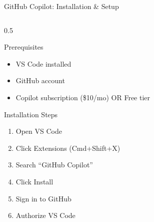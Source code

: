 \documentclass[aspectratio=169,11pt]{beamer}
\begin{document}
\begin{frame}{GitHub Copilot: Installation \& Setup}
    \begin{columns}[T]
        \begin{column}{0.5\textwidth}
            \begin{block}{Prerequisites}
                \begin{itemize}
                    \item VS Code installed
                    \item GitHub account
                    \item Copilot subscription (\$10/mo) OR Free tier
                \end{itemize}
            \end{block}

            \begin{block}{Installation Steps}
                \begin{enumerate}
                    \item Open VS Code
                    \item Click Extensions (Cmd+Shift+X)
                    \item Search ``GitHub Copilot''
                    \item Click Install
                    \item Sign in to GitHub
                    \item Authorize VS Code
                \end{enumerate}
            \end{block}


\end{column}
\end{columns}
\end{frame}
\end{document}
